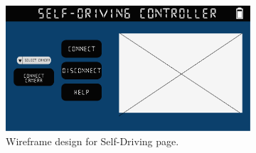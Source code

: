 \documentclass{l4proj}
\begin{document}
\begin{appendices}
\begin{figure}[!h]
    \centering
    \begin{subfigure}{0.67\textwidth}
        \centering
        \includegraphics[width=\textwidth]{images/host-wireframe.pdf}
        \caption{Wireframe design for Self-Driving page.}
        \label{fig:host-wireframe} 
    \end{subfigure}
    \begin{subfigure}{0.32\textwidth}
        \centering

\end{subfigure}
\end{figure}
\end{appendices}
\end{document}
